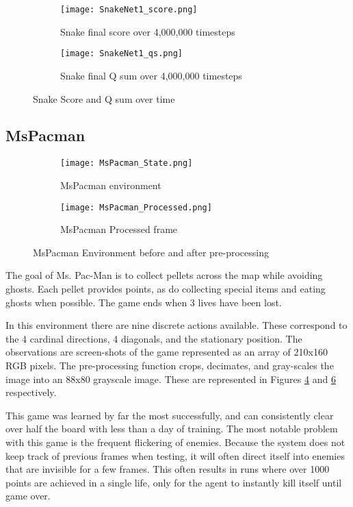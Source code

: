 \documentclass{article}
\begin{document}
\begin{figure}[h]
\centering
\begin{subfigure}{.6\textwidth}
  \centering
  \texttt{[image: SnakeNet1\_score.png]}
  \caption{\label{fig:snake_score}Snake final score over 4,000,000 timesteps}
\end{subfigure}%
\begin{subfigure}{.6\textwidth}
  \centering
  \texttt{[image: SnakeNet1\_qs.png]}
  \caption{\label{fig:snake_qs}Snake final Q sum over 4,000,000 timesteps}
\end{subfigure}
\caption{Snake Score and Q sum over time}
\end{figure}


\subsection{MsPacman}

\begin{figure}[h]
\centering
\begin{subfigure}{.6\textwidth}
  \centering
  \texttt{[image: MsPacman\_State.png]}
  \caption{\label{fig:mspacman_state}MsPacman environment}
\end{subfigure}%
\begin{subfigure}{.6\textwidth}
  \centering
  \texttt{[image: MsPacman\_Processed.png]}
  \caption{\label{fig:mspacman_processed}MsPacman Processed frame}
\end{subfigure}
\caption{MsPacman Environment before and after pre-processing}
\end{figure}

The goal of Ms. Pac-Man is to collect pellets across the map while avoiding ghosts. Each pellet provides points, as do collecting special items and eating ghosts when possible. The game ends when 3 lives have been lost.

In this environment there are nine discrete actions available. These correspond to the 4 cardinal directions, 4 diagonals, and the stationary position. The observations are screen-shots of the game represented as an array of 210x160 RGB pixels. The pre-processing function crops, decimates, and gray-scales the image into an 88x80 grayscale image. These are represented in Figures \ref{fig:mspacman_state} and \ref{fig:mspacman_processed} respectively.

This game was learned by far the most successfully, and can consistently clear over half the board with less than a day of training. The most notable problem with this game is the frequent flickering of enemies. Because the system does not keep track of previous frames when testing, it will often direct itself into enemies that are invisible for a few frames. This often results in runs where over 1000 points are achieved in a single life, only for the agent to instantly kill itself until game over.
\end{document}
